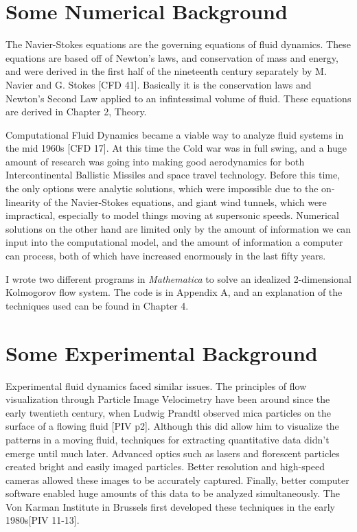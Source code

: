 \section{Some Numerical Background}

	The Navier-Stokes equations are the governing equations of fluid dynamics.  These equations are based off of Newton's laws, and conservation of mass and energy, and were derived in the first half of the nineteenth century separately by M. Navier and G. Stokes [CFD 41].  Basically it is the conservation laws and Newton's Second Law applied to an infintessimal volume of fluid.  These equations are derived in Chapter 2, Theory.
	
	Computational Fluid Dynamics became a viable way to analyze fluid systems in the mid 1960s [CFD 17].  At this time the Cold war was in full swing, and a huge amount of research was going into making good aerodynamics for both Intercontinental Ballistic Missiles and space travel technology.  Before this time, the only options were analytic solutions, which were impossible due to the on-linearity of the Navier-Stokes equations, and giant wind tunnels, which were impractical, especially to model things moving at supersonic speeds.  Numerical solutions on the other hand are limited only by the amount of information we can input into the computational model, and the amount of information a computer can process, both of which have increased enormously in the last fifty years.
	
	I wrote two different programs in \textit{Mathematica} to solve an idealized 2-dimensional Kolmogorov flow system.  The code is in Appendix A, and an explanation of the techniques used can be found in Chapter 4.


\section{Some Experimental Background}
	
	Experimental fluid dynamics faced similar issues.  The principles of flow visualization through Particle Image Velocimetry have been around since the early twentieth century, when Ludwig Prandtl observed mica particles on the surface of a flowing fluid [PIV p2].  Although this did allow him to visualize the patterns in a moving fluid, techniques for extracting quantitative data didn’t emerge until much later.  Advanced optics such as lasers and florescent particles created bright and easily imaged particles.  Better resolution and high-speed cameras allowed these images to be accurately captured.  Finally, better computer software enabled huge amounts of this data to be analyzed simultaneously.  The Von Karman Institute in Brussels first developed these techniques in the early 1980s[PIV 11-13].

